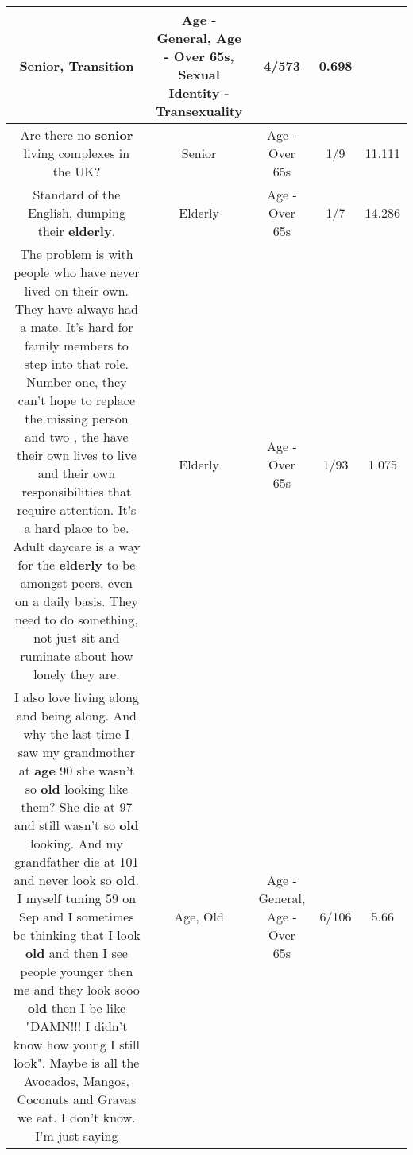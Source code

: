 \documentclass[11pt]{article}
\newlength\mylength
\begin{document}
\begin{center}
\begin{longtable}{|C{.65\mylength}|C{.30\mylength}|C{.12\mylength}|C{.12\mylength}|C{.12\mylength}|}
Senior, Transition & Age - General, Age - Over 65s, Sexual Identity - Transexuality & 4/573 & 0.698 \\  \hline
  \small Are there no \textbf{senior} living complexes in the UK?\normalsize   & Senior & Age - Over 65s & 1/9 & 11.111 \\  \hline
  \small Standard of the English, dumping their \textbf{elderly}.\normalsize   & Elderly & Age - Over 65s & 1/7 & 14.286 \\  \hline
  \small The problem is with  people who have never lived on their own.  They have always had a mate.  It's hard for family members to step into that role.  Number one, they can't hope to replace the missing person and two , the have their own lives to live and their own responsibilities that require attention.  It's a hard place to be.  Adult daycare is a way for the \textbf{elderly} to be amongst peers, even on a daily basis.  They need to do something, not just sit and ruminate about how lonely they are.\normalsize   & Elderly & Age - Over 65s & 1/93 & 1.075 \\  \hline
  \small I also love living along and being along. And why the last time I saw my grandmother at \textbf{age} 90 she wasn't so \textbf{old} looking like them? She die at 97 and still wasn't so \textbf{old} looking. And my grandfather die at 101 and never look so \textbf{old}. I myself tuning 59 on Sep and I sometimes be thinking  that I look \textbf{old} and then I see people younger then me and they look sooo \textbf{old} then I be like "DAMN!!!  I didn't know how young I still look".  Maybe is all the Avocados, Mangos, Coconuts and Gravas we eat. I don't know. I'm just saying\normalsize   & Age, Old & Age - General, Age - Over 65s & 6/106 & 5.66 \\  \hline

\end{longtable}
\end{center}
\end{document}
